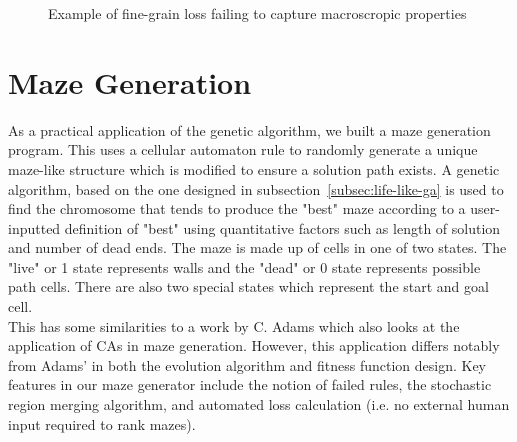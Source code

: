 \begin{figure}[!h]
\centering
            \hfill
            \hfill
            \hfill
            \hfill
            \hfill
            \caption{Example of fine-grain loss failing to capture macroscropic properties}
\label{fig:singleres-fail}
\end{figure}

\section{Maze Generation}

As a practical application of the genetic algorithm, we built a maze generation program. This uses a cellular automaton rule to randomly generate a unique maze-like structure which is modified to ensure a solution path exists. A genetic algorithm, based on the one designed in subsection~\ref{subsec:life-like-ga} is used to find the chromosome that tends to produce the "best" maze according to a user-inputted definition of "best" using quantitative factors such as length of solution and number of dead ends. The maze is made up of cells in one of two states. The "live" or 1 state represents walls and the "dead" or 0 state represents possible path cells. There are also two special states which represent the start and goal cell.\\

This has some similarities to a work by C. Adams\cite{adams2018evolving} which also looks at the application of CAs in maze generation. However, this application differs notably from Adams' in both the evolution algorithm and fitness function design. Key features in our maze generator include the notion of failed rules, the stochastic region merging algorithm, and automated loss calculation (i.e. no external human input required to rank mazes).


